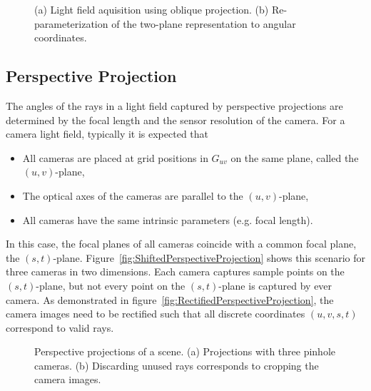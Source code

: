 \begin{figure}
	\subfigure[]{
		\centering
		
		\label{fig:ObliqueProjection}
	}
	\hfill
	\subfigure[]{
		\centering
		
		\label{fig:ObliqueProjectionReparameterization}
	}
	\caption{(a) Light field aquisition using oblique projection. (b) Re-parameterization of the two-plane representation to angular coordinates.}
\end{figure}

\subsection*{Perspective Projection}
% 
The angles of the rays in a light field captured by perspective projections are determined by the focal length and the sensor resolution of the camera.
For a camera light field, typically it is expected that
\begin{itemize}
	\item All cameras are placed at grid positions in $G_{uv}$ on the same plane, called the $(u, v)$-plane, 
	\item The optical axes of the cameras are parallel to the $(u, v)$-plane, 
	\item All cameras have the same intrinsic parameters (e.g. focal length).
\end{itemize}
In this case, the focal planes of all cameras coincide with a common focal plane, the $(s, t)$-plane.
Figure~\ref{fig:ShiftedPerspectiveProjection} shows this scenario for three cameras in two dimensions.
Each camera captures sample points on the $(s, t)$-plane, but not every point on the $(s, t)$-plane is captured by ever camera.
As demonstrated in figure~\ref*{fig:RectifiedPerspectiveProjection}, the camera images need to be rectified such that all discrete coordinates $(u, v, s, t)$ correspond to valid rays.



\begin{figure}
	\subfigure[]{
		\centering
		
		\label{fig:ShiftedPerspectiveProjection}
	}
	\hfill
	\subfigure[]{
		\centering
		
		\label{fig:RectifiedPerspectiveProjection}
	}
	\caption{Perspective projections of a scene. 
			 (a) Projections with three pinhole cameras. 
			 (b) Discarding unused rays corresponds to cropping the camera images.}
\end{figure}


